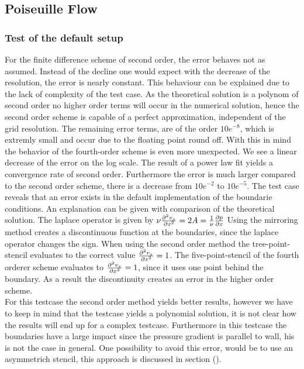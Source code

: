 \subsection{Poiseuille Flow}
\subsubsection{Test of the default setup}
For the finite difference scheme of second order, the error behaves not as assumed.
Instead of the decline one would expect with the decrease of the resolution, the  error is nearly constant.
This behaviour can be explained due to the lack of complexity of the test case.
 As the theoretical solution is a polynom of second order
no higher order terms will occur in the numerical solution, hence the
 second order scheme is capable of a perfect approximation, independent of the
grid resolution. The remaining error terms, are of the order $10e^{-8}$,
 which is extremly small and occur due to the floating point round off.
With this in mind the behavior of the fourth-order scheme is even more unexpected.
We see a linear decrease of the error on the log scale.
The result of a power law fit yields a convergence rate of second order.
Furthermore the error is much larger compared to the second order scheme,
 there is a decrease from $10e^{-2}$ to $10e^{-5}$.
The test case reveals that an error exists in the default implementation of the boundarie conditions.
An explanation can be given with comparison of the theoretical solution. The laplace operator is given by
 $ \nu \pdn[^2 v_x]{x^2} = 2A = \frac{1}{\nu}\pdn[p]{x}$
Using the mirroring method creates a discontinuous function at the boundaries, since the laplace operator changes the sign.
When using the second order method the tree-point-stencil evaluates to the correct value $\pdn[^2 v_x]{x^2} = 1$.
The five-point-stencil of the fourth orderer scheme evaluates to $\pdn[^2 v_x]{x^2} = 1$, since it uses one point behind the boundary.
As a result the discontinuity creates an error in the higher order scheme.\\
For this testcase the second order method yields better results, however we
have to keep in mind that the testcase yields a polynomial solution,
it is not clear how the results will end up for a complex testcase.
Furthermore in this testcase the boundaries have a large impact since the pressure gradient is parallel to wall,
his is not the case in general.
One possibility to avoid this error, would be to use an asymmetrich stencil, this approach is discussed in section ().

